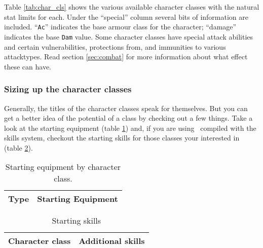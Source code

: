 Table \ref{tab:char_cls} shows the various available character classes with
the natural stat limits for each.
Under the ``special'' column several bits of information are included. ``{\tt Ac}''
 indicates the base armour class
for the character; ``damage''
indicates the base {\tt Dam} value.
Some character classes have special attack abilities and certain vulnerabilities,
protections from, and immunities to various attacktypes. Read section
\ref{sec:combat} for more information about what effect these can have.

\subsubsection{Sizing up the character classes}

Generally, the titles of the character classes speak for themselves. But
you can get a better idea of the potential of a class by checking out a
few things. Take a look at the starting equipment
(table \ref{tab:start_equip}) and, if you are using \cf\ compiled with
the skills system, checkout the starting skills for those classes your interested
in (table \ref{tab:skill_start}).


\begin{table}
\begin{center}
\scriptsize
\caption{Starting equipment by character class. \label{tab:start_equip}}
\vskip 12pt
\begin{tabular}{|l|l|} \hline
Type & Starting Equipment \\ \hline\hline

\hline
\end{tabular}
\end{center}
\end{table}

\begin{table}
\footnotesize
\caption{Starting skills} \label{tab:skill_start}
\vskip 12pt
\begin{center}
\begin{tabular}{|l|l|} \hline
Character class 	& Additional skills\tablenotemark{1} \\ \hline\hline

\hline
\end{tabular}
\end{center}
\end{table}


